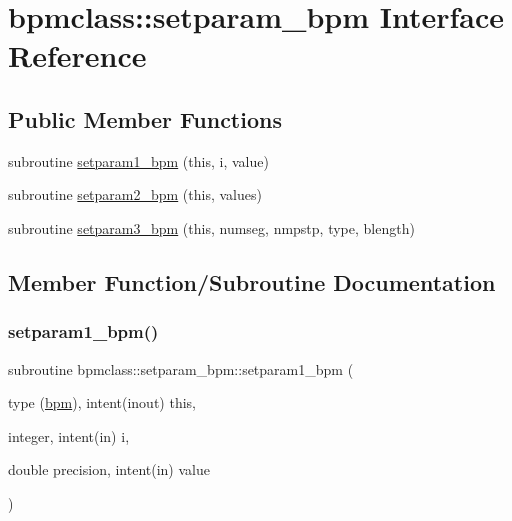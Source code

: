 \hypertarget{interfacebpmclass_1_1setparam__bpm}{}\section{bpmclass\+::setparam\+\_\+bpm Interface Reference}
\label{interfacebpmclass_1_1setparam__bpm}
\subsection*{Public Member Functions}
\begin{DoxyCompactItemize}
\item 
subroutine \mbox{\hyperlink{interfacebpmclass_1_1setparam__bpm_a35ef8d8dcf807ab925b1bf25e9d68028}{setparam1\+\_\+bpm}} (this, i, value)
\item 
subroutine \mbox{\hyperlink{interfacebpmclass_1_1setparam__bpm_aae11500cfaecf01936e220a8eb0327b8}{setparam2\+\_\+bpm}} (this, values)
\item 
subroutine \mbox{\hyperlink{interfacebpmclass_1_1setparam__bpm_a7058c566d7dd0e3bb6480d1f50c9604b}{setparam3\+\_\+bpm}} (this, numseg, nmpstp, type, blength)
\end{DoxyCompactItemize}


\subsection{Member Function/\+Subroutine Documentation}
\mbox{\label{interfacebpmclass_1_1setparam__bpm_a35ef8d8dcf807ab925b1bf25e9d68028}} 
\subsubsection{\texorpdfstring{setparam1\_bpm()}{setparam1\_bpm()}}
{\footnotesize\ttfamily subroutine bpmclass\+::setparam\+\_\+bpm\+::setparam1\+\_\+bpm (\begin{DoxyParamCaption}\item[{type (\mbox{\hyperlink{namespacebpmclass_structbpmclass_1_1bpm}{bpm}}), intent(inout)}]{this,  }\item[{integer, intent(in)}]{i,  }\item[{double precision, intent(in)}]{value }\end{DoxyParamCaption})}

